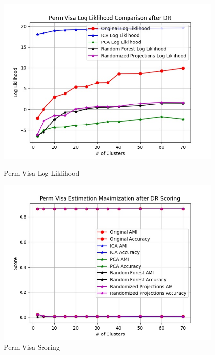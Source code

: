 \documentclass[h]{article}
\begin{document}
 \begin{figure}[H]
      \includegraphics[width=1\textwidth,keepaspectratio]{perm_visa_log_liklihood_comparison_after_dr.jpg} 
      \caption*{Perm Visa Log Liklihood} 
   \endminipage\hfill
      \includegraphics[width=1\textwidth,keepaspectratio]{perm_visa_estimation_maximization_after_dr_scoring.jpg} 
      \caption*{Perm Visa Scoring} 
   \endminipage\hfill

\end{figure}
\end{document}
